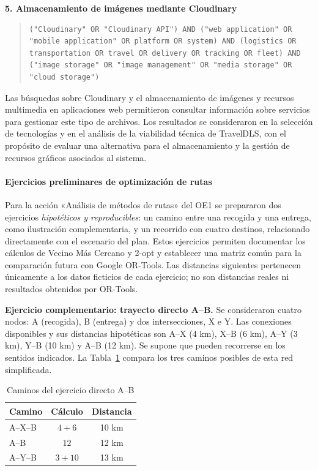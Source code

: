 \textbf{5. Almacenamiento de imágenes mediante Cloudinary}

\begin{quote}
	\begin{lstlisting}[style=cadenas]
		("Cloudinary" OR "Cloudinary API") AND ("web application" OR "mobile application" OR platform OR system) AND (logistics OR transportation OR travel OR delivery OR tracking OR fleet) AND ("image storage" OR "image management" OR "media storage" OR "cloud storage")
	\end{lstlisting}
\end{quote}

Las búsquedas sobre Cloudinary y el almacenamiento de imágenes y recursos multimedia en aplicaciones web permitieron consultar información sobre servicios para gestionar este tipo de archivos. Los resultados se consideraron en la selección de tecnologías y en el análisis de la viabilidad técnica de TravelDLS, con el propósito de evaluar una alternativa para el almacenamiento y la gestión de recursos gráficos asociados al sistema.

\paragraph{Ejercicios preliminares de optimización de rutas}
Para la acción «Análisis de métodos de rutas» del OE1 se prepararon dos ejercicios \emph{hipotéticos y reproducibles}: un camino entre una recogida y una entrega, como ilustración complementaria, y un recorrido con cuatro destinos, relacionado directamente con el escenario del plan. Estos ejercicios permiten documentar los cálculos de Vecino Más Cercano y 2-opt y establecer una matriz común para la comparación futura con Google OR-Tools. Las distancias siguientes pertenecen únicamente a los datos ficticios de cada ejercicio; no son distancias reales ni resultados obtenidos por OR-Tools.

\textbf{Ejercicio complementario: trayecto directo A--B.} Se consideraron cuatro nodos: A (recogida), B (entrega) y dos intersecciones, X e Y. Las conexiones disponibles y sus distancias hipotéticas son A--X (4 km), X--B (6 km), A--Y (3 km), Y--B (10 km) y A--B (12 km). Se supone que pueden recorrerse en los sentidos indicados. La Tabla~\ref{tab:caminos-hipoteticos} compara los tres caminos posibles de esta red simplificada.

\begin{table}[H]
\centering
\caption{Caminos del ejercicio directo A--B}
\label{tab:caminos-hipoteticos}
\begin{tabular}{lcc}
\toprule
Camino & Cálculo & Distancia \\
\midrule
A--X--B & $4+6$ & 10 km \\
A--B & $12$ & 12 km \\
A--Y--B & $3+10$ & 13 km \\
\bottomrule
\end{tabular}
\end{table}

